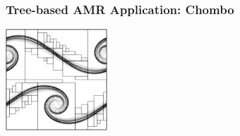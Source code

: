 \begin{frame}[fragile] \frametitle{Tree-based AMR Application: Chombo}
\centerline{\includegraphics[width=1.5in]{chombo.png}}
\end{frame}
